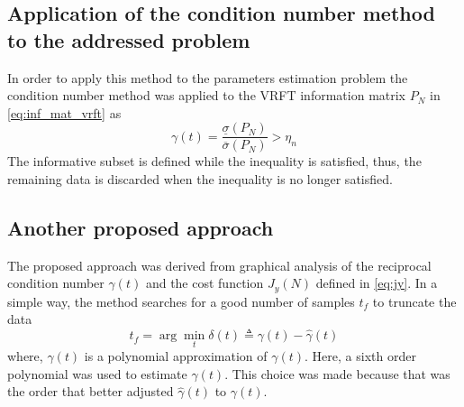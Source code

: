 


\subsection{Application of the condition number method to the addressed problem}
In order to apply this method to the parameters estimation problem the condition number method was applied to the VRFT information matrix $P_N$ in \eqref{eq:inf_mat_vrft} as
\[
  \gamma(t) = \frac{\underline{\sigma}(P_N)}{\overline{\sigma}(P_N)} > \eta_n
\]
The informative subset is defined while the inequality is satisfied, thus, the remaining data is discarded when the inequality is no longer satisfied.

\subsection{Another proposed approach}

The proposed approach was derived from graphical analysis of the reciprocal condition number $\gamma(t)$ and the cost function $J_y(N)$ defined in \eqref{eq:jy}.
In a simple way, the method searches for a good number of samples $t_f$ to truncate the data
\begin{equation}
	t_f = \arg \min_t \delta(t) \triangleq \gamma(t) - \hat{\gamma}(t)
\label{eq:proposed_method}
\end{equation}
where, $\hat{\gamma}(t)$ is a polynomial approximation of $\gamma(t)$.
Here, a sixth order polynomial was used to estimate $\hat{\gamma}(t)$.
This choice was made because that was the order that better adjusted $\hat{\gamma}(t)$ to $\gamma(t)$.


